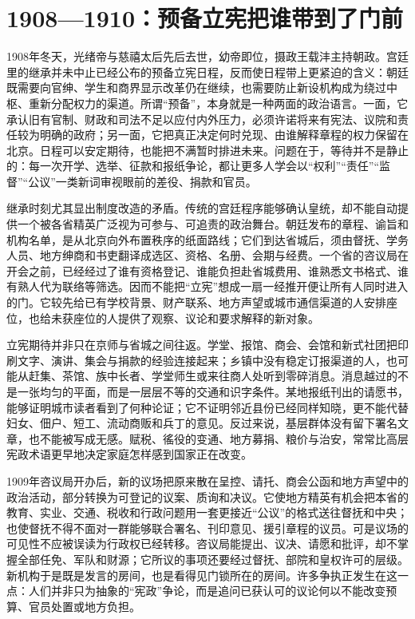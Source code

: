 \section{1908—1910：预备立宪把谁带到了门前}

1908年冬天，光绪帝与慈禧太后先后去世，幼帝即位，摄政王载沣主持朝政。宫廷里的继承并未中止已经公布的预备立宪日程，反而使日程带上更紧迫的含义：朝廷既需要向官绅、学生和商界显示改革仍在继续，也需要防止新设机构成为绕过中枢、重新分配权力的渠道。所谓“预备”，本身就是一种两面的政治语言。一面，它承认旧有官制、财政和司法不足以应付内外压力，必须许诺将来有宪法、议院和责任较为明确的政府；另一面，它把真正决定何时兑现、由谁解释章程的权力保留在北京。日程可以安定期待，也能把不满暂时排进未来。问题在于，等待并不是静止的：每一次开学、选举、征款和报纸争论，都让更多人学会以“权利”“责任”“监督”“公议”一类新词审视眼前的差役、捐款和官员。

继承时刻尤其显出制度改造的矛盾。传统的宫廷程序能够确认皇统，却不能自动提供一个被各省精英广泛视为可参与、可追责的政治舞台。朝廷发布的章程、谕旨和机构名单，是从北京向外布置秩序的纸面路线；它们到达省城后，须由督抚、学务人员、地方绅商和书吏翻译成选区、资格、名册、会期与经费。一个省的咨议局在开会之前，已经经过了谁有资格登记、谁能负担赴省城费用、谁熟悉文书格式、谁有熟人代为联络等筛选。因而不能把“立宪”想成一扇一经推开便让所有人同时进入的门。它较先给已有学校背景、财产联系、地方声望或城市通信渠道的人安排座位，也给未获座位的人提供了观察、议论和要求解释的新对象。

立宪期待并非只在京师与省城之间往返。学堂、报馆、商会、会馆和新式社团把印刷文字、演讲、集会与捐款的经验连接起来；乡镇中没有稳定订报渠道的人，也可能从赶集、茶馆、族中长者、学堂师生或来往商人处听到零碎消息。消息越过的不是一张均匀的平面，而是一层层不等的交通和识字条件。某地报纸刊出的请愿书，能够证明城市读者看到了何种论证；它不证明邻近县份已经同样知晓，更不能代替妇女、佃户、短工、流动商贩和兵丁的意见。反过来说，基层群体没有留下署名文章，也不能被写成无感。赋税、徭役的变通、地方募捐、粮价与治安，常常比高层宪政术语更早地决定家庭怎样感到国家正在改变。

1909年咨议局开办后，新的议场把原来散在呈控、请托、商会公函和地方声望中的政治活动，部分转换为可登记的议案、质询和决议。它使地方精英有机会把本省的教育、实业、交通、税收和行政问题用一套更接近“公议”的格式送往督抚和中央；也使督抚不得不面对一群能够联合署名、刊印意见、援引章程的议员。可是议场的可见性不应被误读为行政权已经转移。咨议局能提出、议决、请愿和批评，却不掌握全部任免、军队和财源；它所议的事项还要经过督抚、部院和皇权许可的层级。新机构于是既是发言的房间，也是看得见门锁所在的房间。许多争执正发生在这一点：人们并非只为抽象的“宪政”争论，而是追问已获认可的议论何以不能改变预算、官员处置或地方负担。

